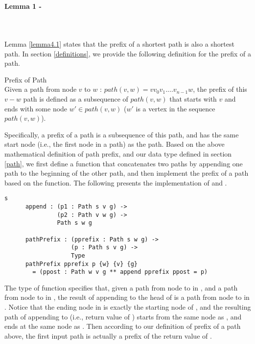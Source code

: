 \paragraph{Lemma 1 - } \label{lemma1V}
\tab\\\\
Lemma \ref{lemma4.1} states that the prefix of a shortest path is also a shortest path. In section \ref{definitions}, we provide the following definition for the prefix of a path.
\begin{definition}{Prefix of Path}\\
Given a path from node $v$ to $w$ : $path(v, w) = vv_0v_1....v_{n-1}w$, the prefix of this $v-w$ path is defined as a subsequence of $path(v, w)$ that starts with $v$ and ends with some node $w' \in path(v, w)$ ($w'$ is a vertex in the sequence $path(v, w)$). 
\end{definition}

Specifically, a prefix of a path is a subsequence of this path, and has the same start node (i.e., the first node in a path) as the path. Based on the above mathematical definition of path prefix, and our  data type defined in section \ref{path}, we first define a  function that concatenates two paths by appending one path to the beginning of the other path, and then implement the prefix of a path based on the  function. The following presents the implementation of  and . 
\begin{lstlisting}s
      append : (p1 : Path s v g) ->
               (p2 : Path v w g) ->
               Path s w g

      pathPrefix : (pprefix : Path s w g) ->
                   (p : Path s v g) ->
                   Type
      pathPrefix pprefix p {w} {v} {g} 
      	= (ppost : Path w v g ** append pprefix ppost = p)
\end{lstlisting}
 
The type of  function specifies that, given a path  from node  to  in , and a path  from node  to  in , the result of appending  to the head of  is a path from node  to  in . Notice that the ending node  in  is exactly the starting node of , and the resulting path of appending  to  (i.e., return value of ) starts from the same node as , and ends at the same node as . Then according to our definition of prefix of a path above, the first input path  is actually a prefix of the return value of . 
\\

